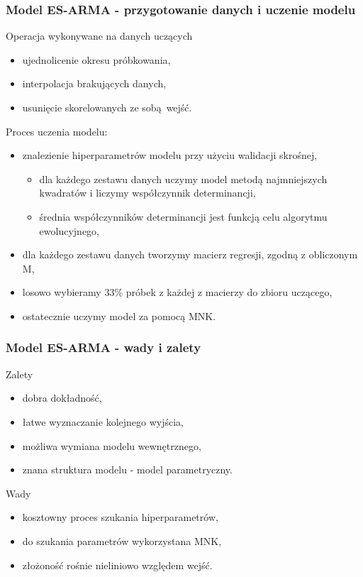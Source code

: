 \documentclass{beamer}
\begin{document}
\begin{frame}
  \frametitle{Model ES-ARMA - przygotowanie danych i uczenie modelu}
  \begin{block}{Operacja wykonywane na danych uczących}
    \begin{itemize}
      \item ujednolicenie okresu próbkowania,
      \item interpolacja brakujących danych,
      \item usunięcie skorelowanych ze sobą wejść.
    \end{itemize}
  \end{block}

  \begin{block}{Proces uczenia modelu:}
    \begin{itemize}
      \item znalezienie hiperparametrów modelu przy użyciu walidacji skrośnej,
      \begin{itemize}
        \item dla każdego zestawu danych uczymy model metodą najmniejszych kwadratów i liczymy współczynnik determinancji,
        \item średnia współczynników determinancji jest funkcją celu algorytmu ewolucyjnego,
      \end{itemize}
      \item dla każdego zestawu danych tworzymy macierz regresji, zgodną z obliczonym M,
      \item losowo wybieramy 33\% próbek z każdej z macierzy do zbioru uczącego,
      \item ostatecznie uczymy model za pomocą MNK.
    \end{itemize}
  \end{block}
\end{frame}

\begin{frame}
  \frametitle{Model ES-ARMA - wady i zalety}
  \begin{exampleblock}{Zalety}
    \begin{itemize}
      \item dobra dokładność,
      \item łatwe wyznaczanie kolejnego wyjścia,
      \item możliwa wymiana modelu wewnętrznego,
      \item znana struktura modelu - model parametryczny.
    \end{itemize}
  \end{exampleblock}
  \begin{alertblock}{Wady}
    \begin{itemize}
      \item kosztowny proces szukania hiperparametrów,
      \item do szukania parametrów wykorzystana MNK,
      \item złożoność rośnie nieliniowo względem wejść.
    \end{itemize}
  \end{alertblock}
\end{frame}
\end{document}
